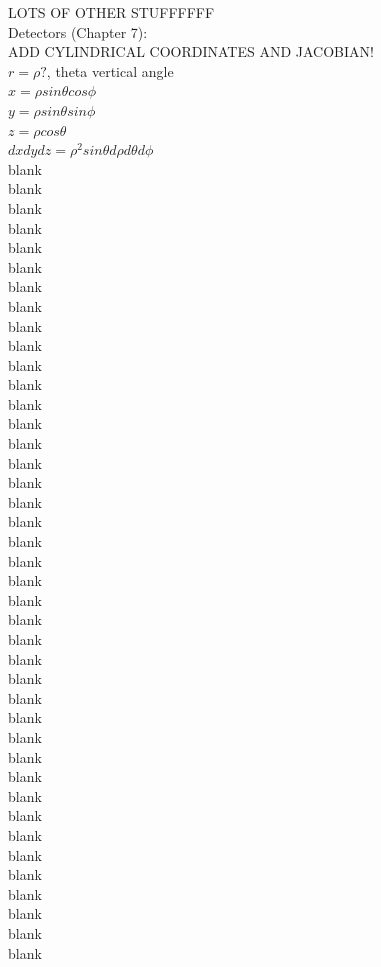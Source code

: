 \documentclass{article}
\begin{document}
\begin{multicols}{3}
LOTS OF OTHER STUFFFFFF\\

Detectors (Chapter 7):\\


ADD CYLINDRICAL COORDINATES AND JACOBIAN!\\
$r = \rho?$, theta vertical angle\\
$x = \rho sin\theta cos\phi$\\
$y = \rho sin\theta sin\phi$\\
$z = \rho cos\theta$\\
$dxdydz = \rho^{2}sin\theta d\rho d\theta d\phi$\\
blank\\
blank\\
blank\\
blank\\
blank\\
blank\\
blank\\
blank\\
blank\\
blank\\
blank\\
blank\\
blank\\
blank\\
blank\\
blank\\
blank\\
blank\\
blank\\
blank\\
blank\\
blank\\
blank\\
blank\\
blank\\
blank\\
blank\\
blank\\
blank\\
blank\\
blank\\
blank\\
blank\\
blank\\
blank\\
blank\\
blank\\
blank\\
blank\\
blank\\
blank\\

\end{multicols}
\end{document}
